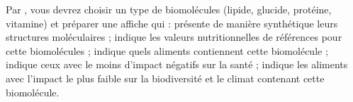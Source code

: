 \begin{tacheFinale}
  Par , vous devrez choisir un type de biomolécules (lipide, glucide, protéine, vitamine) et préparer une affiche qui : présente de manière synthétique leurs structures moléculaires ; indique les valeurs nutritionnelles de références pour cette biomolécules ; indique quels aliments contiennent cette biomolécule ; indique ceux avec le moins d'impact négatifs sur la santé ; indique les aliments avec l'impact le plus faible sur la biodiversité et le climat contenant cette biomolécule.
\end{tacheFinale}


